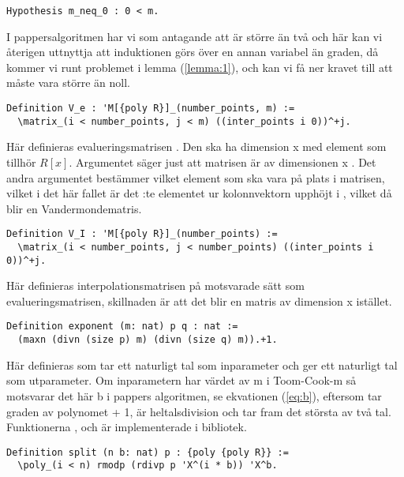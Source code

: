 \begin{lstlisting}
Hypothesis m_neq_0 : 0 < m.
\end{lstlisting}

I pappersalgoritmen har vi som antagande att  är större än två och här kan
vi återigen uttnyttja att induktionen görs över en annan variabel än graden, då
kommer vi runt problemet i lemma (\ref{lemma:1}), och kan vi få ner kravet till
att  måste vara större än noll.

\begin{lstlisting}
Definition V_e : 'M[{poly R}]_(number_points, m) :=
  \matrix_(i < number_points, j < m) ((inter_points i 0))^+j.
\end{lstlisting}

Här definieras evalueringsmatrisen . Den ska ha dimension
 x  med element som tillhör $R[x]$. Argumentet  säger just att matrisen är av dimensionen
 x . Det andra argumentet 
bestämmer vilket element som ska vara på plats  i matrisen, vilket i
det här fallet är det :te elementet ur kolonnvektorn 
upphöjt i , vilket då blir en Vandermondematris.

\begin{lstlisting}
Definition V_I : 'M[{poly R}]_(number_points) :=
  \matrix_(i < number_points, j < number_points) ((inter_points i 0))^+j.
\end{lstlisting}

Här definieras interpolationsmatrisen på motsvarade sätt som
evalueringsmatrisen, skillnaden är att det blir en matris av dimension
 x  istället.

\begin{lstlisting}
Definition exponent (m: nat) p q : nat :=
  (maxn (divn (size p) m) (divn (size q) m)).+1.
\end{lstlisting}

Här definieras  som tar ett naturligt tal  som inparameter och
ger ett naturligt tal som utparameter. Om inparametern har värdet av m i
Toom-Cook-m så motsvarar det här b i pappers algoritmen, se ekvationen
(\ref{eq:b}), eftersom  tar graden av polynomet + 1,  är
heltalsdivision och  tar fram det största av två tal. Funktionerna
,  och  är implementerade i \ssr{} bibliotek.

\begin{lstlisting}
Definition split (n b: nat) p : {poly {poly R}} :=
  \poly_(i < n) rmodp (rdivp p 'X^(i * b)) 'X^b.
\end{lstlisting}

